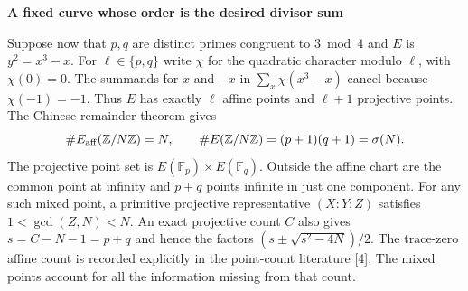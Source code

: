 \documentclass[12pt,letterpaper]{article}
\newcommand{\subh}[1]{{\sffamily\bfseries\color{accent}#1}\par}
\newcommand{\F}{\mathbb F}\newcommand{\Z}{\mathbb Z}
\newcommand{\rs}[1]{\textup{[#1]}}
\begin{document}
\subh{A fixed curve whose order is the desired divisor sum}
Suppose now that $p,q$ are distinct primes congruent to $3\bmod4$ and $E$ is $y^2=x^3-x$. For $\ell\in\{p,q\}$ write $\chi$ for the quadratic character modulo $\ell$, with $\chi(0)=0$. The summands for $x$ and $-x$ in $\sum_x\chi(x^3-x)$ cancel because $\chi(-1)=-1$. Thus $E$ has exactly $\ell$ affine points and $\ell+1$ projective points. The Chinese remainder theorem gives
\[
 \#E_{\rm aff}(\Z/N\Z)=N,\qquad
 \#E(\Z/N\Z)=(p+1)(q+1)=\sigma(N).
\]
The projective point set is $E(\F_p)\times E(\F_q)$. Outside the affine chart are the common point at infinity and $p+q$ points infinite in just one component. For any such mixed point, a primitive projective representative $(X:Y:Z)$ satisfies $1<\gcd(Z,N)<N$. An exact projective count $C$ also gives $s=C-N-1=p+q$ and hence the factors $(s\pm\sqrt{s^2-4N})/2$. The trace-zero affine count is recorded explicitly in the point-count literature \rs{4}. The mixed points account for all the information missing from that count.
\newpage


\end{document}
